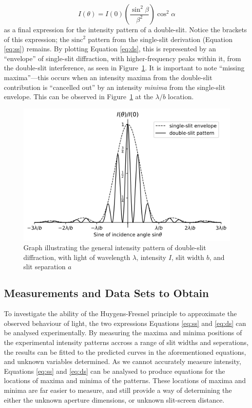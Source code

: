 \documentclass[a4paper]{article}
\begin{document}
\begin{equation} \label{eq:ds}
I(\theta)=I(0)\left(\frac{\sin^2\beta}{\beta^2}\right)\cos^2\alpha
\end{equation} as a final expression for the intensity pattern of a double-slit. Notice the brackets of this expression; the $\text{sinc}^2$ pattern from the single-slit derivation (Equation \ref{eq:ss}) remains. By plotting Equation \ref{eq:ds}, this is represented by an ``envelope'' of single-slit diffraction, with higher-frequency peaks within it, from the double-slit interference, as seen in Figure~\ref{fig:doubledemo}. It is important to note ``missing maxima''---this occurs when an intensity maxima from the double-slit contribution is ``cancelled out'' by an intensity {\it minima} from the single-slit envelope. This can be observed in Figure~\ref{fig:doubledemo} at the $\lambda/b$ location.

\begin{figure}[h]
  \centerline{\includegraphics[scale=0.7]{ds_demo.png}}
  \captionsetup{justification=centering}
  \caption{Graph illustrating the general intensity pattern of double-slit diffraction, with light of wavelength $\lambda$, intensity $I$, slit width $b$, and slit separation $a$}
  \label{fig:doubledemo}
\end{figure}

\subsection{Measurements and Data Sets to Obtain}

To investigate the ability of the Huygens-Fresnel principle to approximate the observed behaviour of light, the two expressions Equations \ref{eq:ss} and \ref{eq:ds} can be analysed experimentally. By measuring the maxima and minima positions of the experimental intensity patterns accross a range of slit widths and seperations, the results can be fitted to the predicted curves in the aforementioned equations, and unknown variables determined. As we cannot accurately measure intensity, Equations \ref{eq:ss} and \ref{eq:ds} can be analysed to produce equations for the locations of maxima and minima of the patterns. These locations of maxima and minima are far easier to measure, and still provide a way of determining the either the unknown aperture dimensions, or unknown slit-screen distance.
\clearpage
\end{document}
